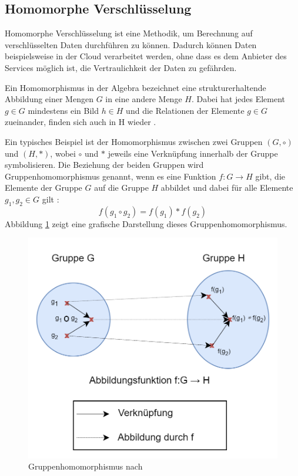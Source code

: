 \subsection{Homomorphe Verschlüsselung}\label{sec:homomorphe_verschlüsselung}

Homomorphe Verschlüsselung ist eine Methodik, um Berechnung auf verschlüsselten Daten durchführen zu können. Dadurch können Daten beispielsweise in der Cloud verarbeitet werden, ohne dass es dem Anbieter des Services möglich ist, die Vertraulichkeit der Daten zu gefährden.

Ein Homomorphismus in der Algebra bezeichnet eine strukturerhaltende Abbildung einer Mengen $G$ in eine andere Menge $H$.
Dabei hat jedes Element $g \in G $ mindestens ein Bild $h \in H$ und die Relationen der Elemente $g \in G$ zueinander, finden sich auch in H wieder \cite{B-2}.

Ein typisches Beispiel ist der Homomorphismus zwischen zwei Gruppen $(G,\circ)$ und $(H,\ast)$, wobei $\circ$ und $\ast$ jeweils eine Verknüpfung innerhalb der Gruppe symbolisieren. 
Die Beziehung der beiden Gruppen wird Gruppenhomomorphismus genannt, wenn es eine Funktion $f:G\to H$ gibt, die Elemente der Gruppe $G$ auf die Gruppe $H$ abbildet und dabei für alle Elemente $g_1,g_2 \in G$ gilt \cite{P-98}:
\begin{equation*}
    f(g_1 \circ g_2) = f(g_1) \ast f(g_2)
\end{equation*}
Abbildung \ref{fig:group_homomorphismus} zeigt eine grafische Darstellung dieses Gruppenhomomorphismus.

\begin{figure}[!htb]
    \centering
    \includegraphics[width=12cm]{figures/group_homomophismus.png}
    \caption{Gruppenhomomorphismus nach \cite{P-98}}
    \label{fig:group_homomorphismus}
\end{figure} 

